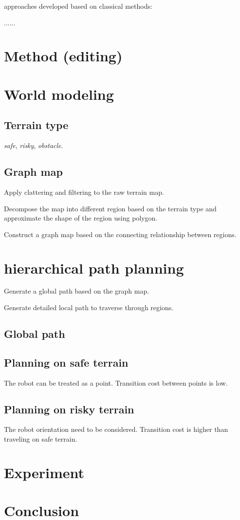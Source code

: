 \documentclass[letterpaper, 12 pt, conference]{ieeeconf}  %
\begin{document}
approaches developed based on classical methods:

......
\cite{greenwade93} %

\section{Method (editing)}
\section{World modeling}
\subsection{Terrain type}

\textit{safe}, \textit{risky}, \textit{obstacle}.

\subsection{Graph map}
Apply clattering and filtering to the raw terrain map.
 
Decompose the map into different region based on the terrain type and approximate the shape of the region using polygon.  

Construct a graph map based on the connecting relationship between regions.


\section{hierarchical path planning}
Generate a global path based on the graph map.

Generate detailed local path to traverse through regions.

\subsection{Global path}

\subsection{Planning on safe terrain}

The robot can be treated as a point. Transition cost between points is low. 

\subsection{Planning on risky terrain}

The robot orientation need to be considered. Transition cost is higher than traveling on safe terrain. 

\section{Experiment}

\section{Conclusion}




\end{document}
